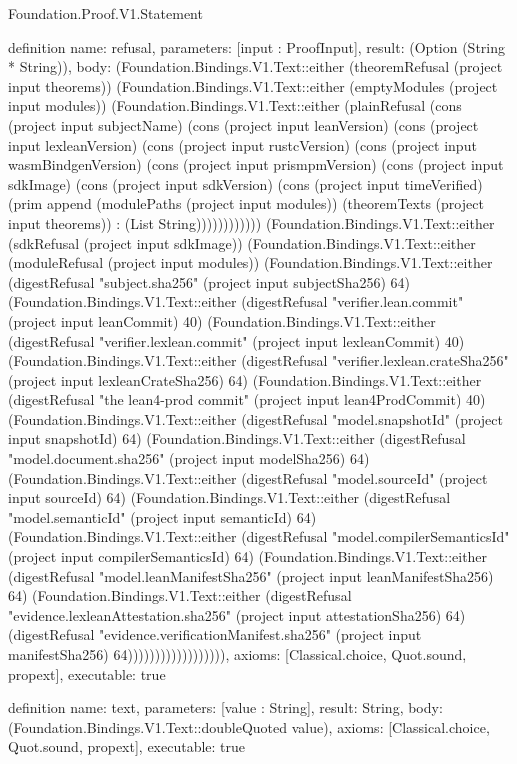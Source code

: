 \begin{lexlean}{Foundation.Proof.V1.Statement}
\begin{semanticmodule}
definition{
  name: refusal,
  parameters: [input : ProofInput],
  result: (Option (String * String)),
  body: (Foundation.Bindings.V1.Text::either (theoremRefusal (project input theorems)) (Foundation.Bindings.V1.Text::either (emptyModules (project input modules)) (Foundation.Bindings.V1.Text::either (plainRefusal (cons (project input subjectName) (cons (project input leanVersion) (cons (project input lexleanVersion) (cons (project input rustcVersion) (cons (project input wasmBindgenVersion) (cons (project input prismpmVersion) (cons (project input sdkImage) (cons (project input sdkVersion) (cons (project input timeVerified) (prim append (modulePaths (project input modules)) (theoremTexts (project input theorems)) : (List String)))))))))))) (Foundation.Bindings.V1.Text::either (sdkRefusal (project input sdkImage)) (Foundation.Bindings.V1.Text::either (moduleRefusal (project input modules)) (Foundation.Bindings.V1.Text::either (digestRefusal "subject.sha256" (project input subjectSha256) 64) (Foundation.Bindings.V1.Text::either (digestRefusal "verifier.lean.commit" (project input leanCommit) 40) (Foundation.Bindings.V1.Text::either (digestRefusal "verifier.lexlean.commit" (project input lexleanCommit) 40) (Foundation.Bindings.V1.Text::either (digestRefusal "verifier.lexlean.crateSha256" (project input lexleanCrateSha256) 64) (Foundation.Bindings.V1.Text::either (digestRefusal "the lean4-prod commit" (project input lean4ProdCommit) 40) (Foundation.Bindings.V1.Text::either (digestRefusal "model.snapshotId" (project input snapshotId) 64) (Foundation.Bindings.V1.Text::either (digestRefusal "model.document.sha256" (project input modelSha256) 64) (Foundation.Bindings.V1.Text::either (digestRefusal "model.sourceId" (project input sourceId) 64) (Foundation.Bindings.V1.Text::either (digestRefusal "model.semanticId" (project input semanticId) 64) (Foundation.Bindings.V1.Text::either (digestRefusal "model.compilerSemanticsId" (project input compilerSemanticsId) 64) (Foundation.Bindings.V1.Text::either (digestRefusal "model.leanManifestSha256" (project input leanManifestSha256) 64) (Foundation.Bindings.V1.Text::either (digestRefusal "evidence.lexleanAttestation.sha256" (project input attestationSha256) 64) (digestRefusal "evidence.verificationManifest.sha256" (project input manifestSha256) 64)))))))))))))))))),
  axioms: [Classical.choice, Quot.sound, propext],
  executable: true
}

definition{
  name: text,
  parameters: [value : String],
  result: String,
  body: (Foundation.Bindings.V1.Text::doubleQuoted value),
  axioms: [Classical.choice, Quot.sound, propext],
  executable: true
}


\end{semanticmodule}
\end{lexlean}
